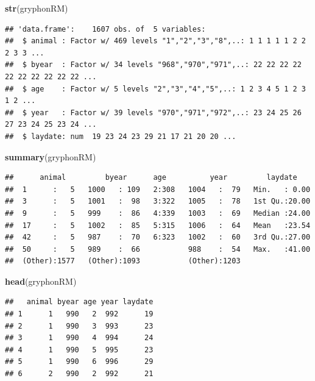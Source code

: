 \documentclass[
  12pt,
]{book}
\newenvironment{Shaded}{\begin{snugshade}}{\end{snugshade}}
\newcommand{\KeywordTok}[1]{\textcolor[rgb]{0.13,0.29,0.53}{\textbf{#1}}}
\newcommand{\NormalTok}[1]{#1}
\begin{document}
\begin{Shaded}
\begin{Highlighting}[]
\KeywordTok{str}\NormalTok{(gryphonRM)}
\end{Highlighting}
\end{Shaded}

\begin{verbatim}
## 'data.frame':    1607 obs. of  5 variables:
##  $ animal : Factor w/ 469 levels "1","2","3","8",..: 1 1 1 1 1 2 2 2 3 3 ...
##  $ byear  : Factor w/ 34 levels "968","970","971",..: 22 22 22 22 22 22 22 22 22 22 ...
##  $ age    : Factor w/ 5 levels "2","3","4","5",..: 1 2 3 4 5 1 2 3 1 2 ...
##  $ year   : Factor w/ 39 levels "970","971","972",..: 23 24 25 26 27 23 24 25 23 24 ...
##  $ laydate: num  19 23 24 23 29 21 17 21 20 20 ...
\end{verbatim}

\begin{Shaded}
\begin{Highlighting}[]
\KeywordTok{summary}\NormalTok{(gryphonRM)}
\end{Highlighting}
\end{Shaded}

\begin{verbatim}
##      animal         byear      age          year         laydate     
##  1      :   5   1000   : 109   2:308   1004   :  79   Min.   : 0.00  
##  3      :   5   1001   :  98   3:322   1005   :  78   1st Qu.:20.00  
##  9      :   5   999    :  86   4:339   1003   :  69   Median :24.00  
##  17     :   5   1002   :  85   5:315   1006   :  64   Mean   :23.54  
##  42     :   5   987    :  70   6:323   1002   :  60   3rd Qu.:27.00  
##  50     :   5   989    :  66           988    :  54   Max.   :41.00  
##  (Other):1577   (Other):1093           (Other):1203
\end{verbatim}

\begin{Shaded}
\begin{Highlighting}[]
\KeywordTok{head}\NormalTok{(gryphonRM)}
\end{Highlighting}
\end{Shaded}

\begin{verbatim}
##   animal byear age year laydate
## 1      1   990   2  992      19
## 2      1   990   3  993      23
## 3      1   990   4  994      24
## 4      1   990   5  995      23
## 5      1   990   6  996      29
## 6      2   990   2  992      21
\end{verbatim}
\end{document}
